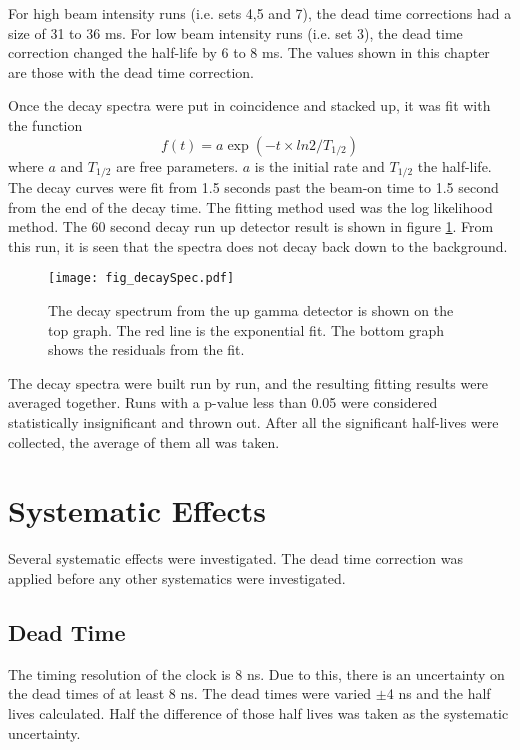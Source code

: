 \documentclass[MaxHughesThesis.tex]{subfiles}
\begin{document}
For high beam intensity runs (i.e. sets 4,5 and 7), the dead time corrections had a size of 31 to 36 ms.
For low beam intensity runs (i.e. set 3), the dead time correction changed the half-life by 6 to 8 ms. 
The values shown in this chapter are those with the dead time correction.

Once the decay spectra were put in coincidence and stacked up, it was fit with the function
%
\begin{equation}
	f(t) = a\exp{(-t \times ln2/T_{1/2})}
	\label{eq:fit-function}
\end{equation}
%
where $a$ and $T_{1/2}$ are free parameters.
$a$ is the initial rate and $T_{1/2}$ the half-life.
The decay curves were fit from 1.5 seconds past the beam-on time to 1.5 second from the end of the decay time. 
The fitting method used was the log likelihood method. 
The 60 second decay run up detector result is shown in figure \ref{fig:60secdecay}.
From this run, it is seen that the spectra does not decay back down to the background. 

\begin{figure}[!htb]
\centerline{\texttt{[image: fig\_decaySpec.pdf]}}
\caption{The decay spectrum from the up gamma detector is shown on the top graph.
	The red line is the exponential fit. 
	The bottom graph shows the residuals from the fit. 
	}
\label{fig:60secdecay}
\end{figure}


The decay spectra were built run by run, and the resulting fitting results were averaged together. 
Runs with a p-value less than 0.05 were considered statistically insignificant and thrown out.
After all the significant half-lives were collected, the average of them all was taken.

\section{Systematic Effects}
Several systematic effects were investigated. 
The dead time correction was applied before any other systematics were investigated. 

\subsection{Dead Time}
The timing resolution of the clock is 8 ns.
Due to this, there is an uncertainty on the dead times of at least 8 ns.
The dead times were varied $\pm$4 ns and the half lives calculated.
Half the difference of those half lives was taken as the systematic uncertainty.
\end{document}
